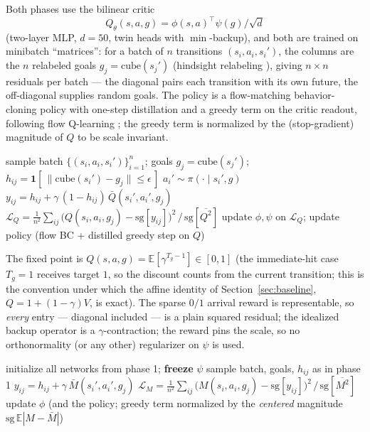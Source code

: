 \documentclass[10pt]{article}
\newcommand{\E}{\mathbb{E}}
\newcommand{\ind}[1]{\mathbf{1}\!\left[#1\right]}
\newcommand{\sg}{\mathrm{sg}}
\begin{document}
Both phases use the bilinear critic
\[
Q_\theta(s,a,g)=\phi(s,a)^{\top}\psi(g)/\sqrt{d}
\]
(two-layer MLP, $d=50$, twin heads with $\min$-backup), and both are trained on minibatch ``matrices'': for a batch of $n$ transitions $(s_i,a_i,s_i')$, the columns are the $n$ relabeled goals $g_j=\mathrm{cube}(s_j')$ (hindsight relabeling \citep{andrychowicz2017hindsight}), giving $n\times n$ residuals per batch --- the diagonal pairs each transition with its own future, the off-diagonal supplies random goals.
The policy is a flow-matching behavior-cloning policy with one-step distillation and a greedy term on the critic readout, following flow Q-learning \citep{park2025flow}; the greedy term is normalized by the (stop-gradient) magnitude of $Q$ to be scale invariant.

\begin{algorithm}[h]
\caption{Phase 1 --- goal-reaching value (absorbing formulation)}
\begin{algorithmic}[1]
  \State sample batch $\{(s_i,a_i,s_i')\}_{i=1}^{n}$; goals $g_j=\mathrm{cube}(s_j')$; $h_{ij}=\ind{\,\|\mathrm{cube}(s_i')-g_j\|\le\epsilon\,}$
  \State $a_i' \sim \pi(\cdot \mid s_i', g)$ 
  \State $y_{ij} = h_{ij} + \gamma\,(1-h_{ij})\,\bar Q(s_i',a_i',g_j)$ 
  \State $\mathcal{L}_Q=\frac{1}{n^2}\sum_{ij}\big(Q(s_i,a_i,g_j)-\sg[y_{ij}]\big)^{2}\,/\,\sg[\overline{Q^{2}}]$
  \State update $\phi,\psi$ on $\mathcal{L}_Q$; update policy (flow BC + distilled greedy step on $Q$)
\EndFor
\end{algorithmic}
\end{algorithm}

The fixed point is $Q(s,a,g)=\E[\gamma^{T_g-1}]\in[0,1]$ (the immediate-hit case $T_g{=}1$
receives target $1$, so the discount counts from the current transition; this is the
convention under which the affine identity of Section~\ref{sec:baseline},
$Q=1+(1-\gamma)V$, is exact).
The sparse $0/1$ arrival reward is representable, so \emph{every} entry --- diagonal
included --- is a plain squared residual; the idealized backup operator is a
$\gamma$-contraction; the reward pins the scale, so no orthonormality (or any other)
regularizer on $\psi$ is used.

\begin{algorithm}[h]
\caption{Phase 2 --- visitation measure on the frozen goal embedding}
\begin{algorithmic}[1]
\State initialize all networks from phase 1; \textbf{freeze} $\psi$
  \State sample batch, goals, $h_{ij}$ as in phase 1
  \State $y_{ij} = h_{ij} + \gamma\,\bar M(s_i',a_i',g_j)$ 
  \State $\mathcal{L}_M=\frac{1}{n^2}\sum_{ij}\big(M(s_i,a_i,g_j)-\sg[y_{ij}]\big)^{2}\,/\,\sg[\overline{M^{2}}]$
  \State update $\phi$ (and the policy; greedy term normalized by the \emph{centered} magnitude $\sg\,\E|M-\bar M|$)
\EndFor
\end{algorithmic}
\end{algorithm}
\end{document}
